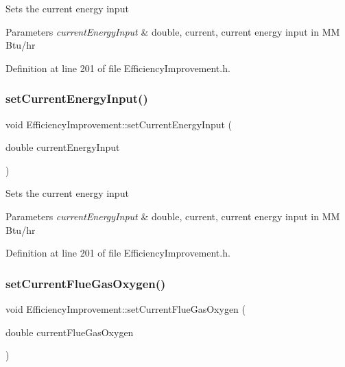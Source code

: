 Sets the current energy input


\begin{DoxyParams}{Parameters}
{\em current\+Energy\+Input} & double, current, current energy input in MM Btu/hr \\
\hline
\end{DoxyParams}


Definition at line 201 of file Efficiency\+Improvement.\+h.

\mbox{\label{class_efficiency_improvement_a72c247fcd3f7791566205ec783e13d81}} 
\subsubsection{\texorpdfstring{set\+Current\+Energy\+Input()}{setCurrentEnergyInput()}\hspace{0.1cm}{\footnotesize\ttfamily [3/3]}}
{\footnotesize\ttfamily void Efficiency\+Improvement\+::set\+Current\+Energy\+Input (\begin{DoxyParamCaption}\item[{double}]{current\+Energy\+Input }\end{DoxyParamCaption})\hspace{0.3cm}{\ttfamily [inline]}}

Sets the current energy input


\begin{DoxyParams}{Parameters}
{\em current\+Energy\+Input} & double, current, current energy input in MM Btu/hr \\
\hline
\end{DoxyParams}


Definition at line 201 of file Efficiency\+Improvement.\+h.

\mbox{\label{class_efficiency_improvement_a038c378d51a5baf96521012a572bb106}} 
\subsubsection{\texorpdfstring{set\+Current\+Flue\+Gas\+Oxygen()}{setCurrentFlueGasOxygen()}\hspace{0.1cm}{\footnotesize\ttfamily [1/3]}}
{\footnotesize\ttfamily void Efficiency\+Improvement\+::set\+Current\+Flue\+Gas\+Oxygen (\begin{DoxyParamCaption}\item[{double}]{current\+Flue\+Gas\+Oxygen }\end{DoxyParamCaption})\hspace{0.3cm}{\ttfamily [inline]}}

